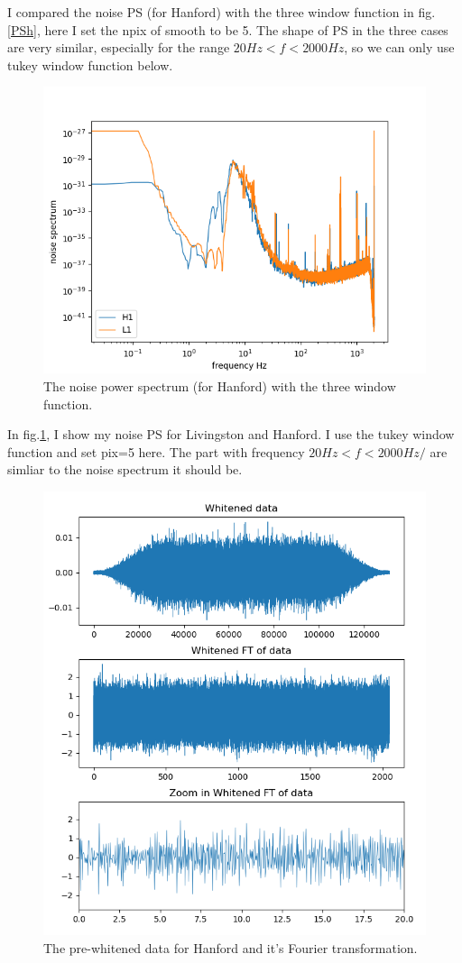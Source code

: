 \documentclass[showpacs, oneside, onecolumn, prl, amsmath, amssymb, nofootinbib, superscriptaddress, notitlepage]{revtex4-1}
\newcommand\bfig{\begin{figure}}
\newcommand\efig{\end{figure}}
\begin{document}
I compared the noise PS (for Hanford) with the three window function in fig.\ref{PSh}, here I set the npix of smooth to be 5. The shape of PS in the three cases are very similar, especially for the range $20Hz<f<2000Hz$, so we can only use tukey window function below.


\bfig
	\centering
	\includegraphics[scale=0.85]{5-1PS.png}
	\caption{The noise power spectrum (for Hanford) with the three window function.}
	\label{PS}
\efig

In fig.\ref{PS}, I show my noise PS for Livingston and Hanford. I use the tukey window function and set pix=5 here. The part with frequency $20 Hz<f<2000Hz/$ are simliar to the noise spectrum it should be.


\bfig
	\centering
	\includegraphics[scale=0.75]{5-1PW.png}
	\caption{The pre-whitened data for Hanford and it's Fourier transformation.}
	\label{5-1PW}
\efig
\end{document}
